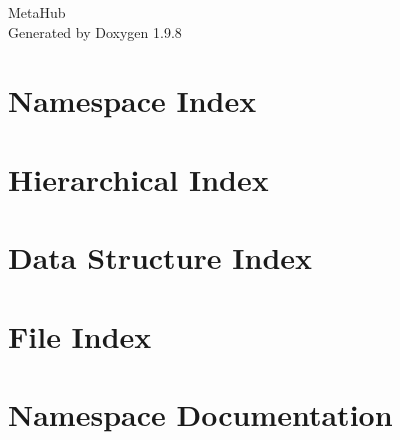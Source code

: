 \documentclass[twoside]{book}
\newcommand{\+}{\discretionary{\mbox{\scriptsize$\hookleftarrow$}}{}{}}
\newcommand{\clearemptydoublepage}{%
    \newpage{\pagestyle{empty}\cleardoublepage}%
  }
\begin{document}
  \raggedbottom
    \hypersetup{pageanchor=false,
                bookmarksnumbered=true,
                pdfencoding=unicode
               }
  \begin{titlepage}
  \vspace*{7cm}
  \begin{center}%
  {\Large Meta\+Hub}\\
  \vspace*{1cm}
  {\large Generated by Doxygen 1.9.8}\\
  \end{center}
  \end{titlepage}
  \clearemptydoublepage
  \tableofcontents
  \clearemptydoublepage
  \hypersetup{pageanchor=true}

\chapter{Namespace Index}

\chapter{Hierarchical Index}

\chapter{Data Structure Index}

\chapter{File Index}

\chapter{Namespace Documentation}





\end{document}
